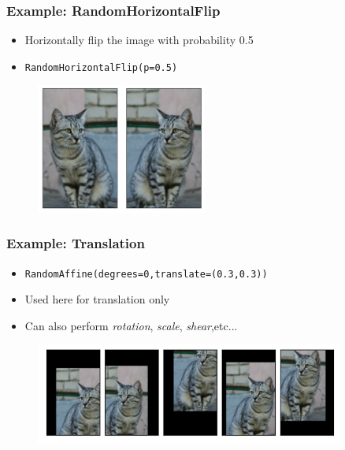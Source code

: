 \documentclass{beamer}
\begin{document}
\begin{frame}[fragile]
    \frametitle{Example: RandomHorizontalFlip}
    \begin{itemize}
        \item Horizontally flip the image with probability 0.5
        \item \lstinline|RandomHorizontalFlip(p=0.5)|
    \end{itemize}
    
\begin{figure}
    \begin{center}
       \includegraphics[width=0.5\textwidth]{figs/flip.png} 
    \end{center}
\end{figure}
\end{frame}
\begin{frame}[fragile]
    \frametitle{Example: Translation}
    \begin{itemize}
        \item \lstinline!RandomAffine(degrees=0,translate=(0.3,0.3))!
        \item Used here for translation only
        \item Can also perform \textit{rotation}, \textit{scale}, \textit{shear},etc...
    \end{itemize}
   
     
    
\begin{figure}
    \begin{center}
       \includegraphics[width=0.9\textwidth]{figs/translate.png} 
    \end{center}
\end{figure}
\end{frame}
\end{document}
